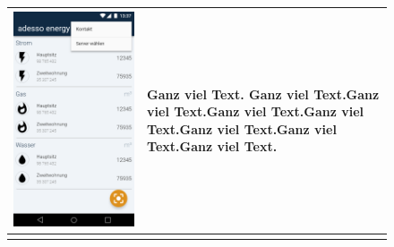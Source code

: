 \begin{figure}[h]
\begin{tabularx}{\textwidth}{X | X}
	\includegraphics[scale = 0.22]{img/AndroidMockup/dropdown} & Ganz viel Text. Ganz viel Text.Ganz viel Text.Ganz viel Text.Ganz viel Text.Ganz viel Text.Ganz viel Text.Ganz viel Text. \\ \hline \\

\end{tabularx}
\end{figure}

